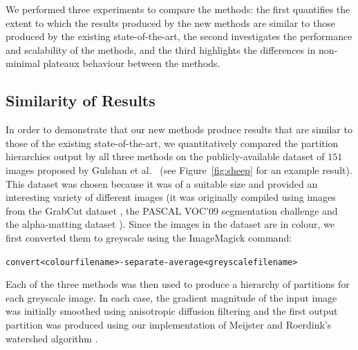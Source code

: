 \documentclass[preprint,a4paper]{elsarticle}
\begin{document}
We performed three experiments to compare the methods: the first quantifies the extent to which the results produced by the new methods are similar to those produced by the existing state-of-the-art, the second investigates the performance and scalability of the methods, and the third highlights the differences in non-minimal plateaux behaviour between the methods.

\subsection{Similarity of Results}
\label{subsec:experiments-similarity}

In order to demonstrate that our new methods produce results that are similar to those of the existing state-of-the-art, we quantitatively compared the partition hierarchies output by all three methods on the publicly-available dataset of $151$ images proposed by Gulshan et al.\ \cite{gulshan10} (see Figure~\ref{fig:sheep} for an example result). This dataset was chosen because it was of a suitable size and provided an interesting variety of different images (it was originally compiled using images from the GrabCut dataset \cite{rother04}, the PASCAL VOC'09 segmentation challenge \cite{everingham09} and the alpha-matting dataset \cite{rhemann09}). Since the images in the dataset are in colour, we first converted them to greyscale using the ImageMagick \cite{imagemagick} command\footnotemark{}:
%
\begin{alltt}\begin{center}
convert <colour filename> -separate -average <greyscale filename>
\end{center}\end{alltt}
%
Each of the three methods was then used to produce a hierarchy of partitions for each greyscale image. In each case, the gradient magnitude of the input image was initially smoothed using anisotropic diffusion filtering \cite{perona90} and the first output partition was produced using our implementation of Meijster and Roerdink's watershed algorithm \cite{meijster98}.

\end{document}
